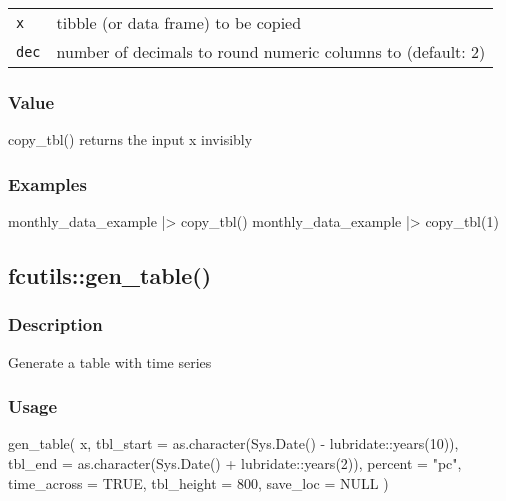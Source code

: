 \documentclass[
  letterpaper,
  DIV=11,
  numbers=noendperiod]{scrreport}
\newenvironment{Shaded}{\begin{snugshade}}{\end{snugshade}}
\newcommand{\AttributeTok}[1]{\textcolor[rgb]{0.40,0.45,0.13}{#1}}
\newcommand{\ConstantTok}[1]{\textcolor[rgb]{0.56,0.35,0.01}{#1}}
\newcommand{\DecValTok}[1]{\textcolor[rgb]{0.68,0.00,0.00}{#1}}
\newcommand{\FunctionTok}[1]{\textcolor[rgb]{0.28,0.35,0.67}{#1}}
\newcommand{\NormalTok}[1]{\textcolor[rgb]{0.00,0.23,0.31}{#1}}
\newcommand{\SpecialCharTok}[1]{\textcolor[rgb]{0.37,0.37,0.37}{#1}}
\newcommand{\StringTok}[1]{\textcolor[rgb]{0.13,0.47,0.30}{#1}}
\begin{document}
\begin{longtable}[]{@{}ll@{}}
\toprule\noalign{}
\endhead
\bottomrule\noalign{}
\endlastfoot
\texttt{x} & tibble (or data frame) to be copied \\
\texttt{dec} & number of decimals to round numeric columns to (default:
2) \\
\end{longtable}

\subsubsection{Value}\label{value-5}

copy\_tbl() returns the input x invisibly

\subsubsection{Examples}\label{examples-5}

\begin{Shaded}
\begin{Highlighting}[]
\NormalTok{monthly\_data\_example }\SpecialCharTok{|\textgreater{}} \FunctionTok{copy\_tbl}\NormalTok{()}
\NormalTok{monthly\_data\_example }\SpecialCharTok{|\textgreater{}} \FunctionTok{copy\_tbl}\NormalTok{(}\DecValTok{1}\NormalTok{)}
\end{Highlighting}
\end{Shaded}

\subsection{fcutils::gen\_table()}\label{fcutilsgen_table}

\subsubsection{Description}\label{description-6}

Generate a table with time series

\subsubsection{Usage}\label{usage-6}

\begin{Shaded}
\begin{Highlighting}[]
\FunctionTok{gen\_table}\NormalTok{(}
\NormalTok{  x,}
  \AttributeTok{tbl\_start =} \FunctionTok{as.character}\NormalTok{(}\FunctionTok{Sys.Date}\NormalTok{() }\SpecialCharTok{{-}}\NormalTok{ lubridate}\SpecialCharTok{::}\FunctionTok{years}\NormalTok{(}\DecValTok{10}\NormalTok{)),}
  \AttributeTok{tbl\_end =} \FunctionTok{as.character}\NormalTok{(}\FunctionTok{Sys.Date}\NormalTok{() }\SpecialCharTok{+}\NormalTok{ lubridate}\SpecialCharTok{::}\FunctionTok{years}\NormalTok{(}\DecValTok{2}\NormalTok{)),}
  \AttributeTok{percent =} \StringTok{"pc"}\NormalTok{,}
  \AttributeTok{time\_across =} \ConstantTok{TRUE}\NormalTok{,}
  \AttributeTok{tbl\_height =} \DecValTok{800}\NormalTok{,}
  \AttributeTok{save\_loc =} \ConstantTok{NULL}
\NormalTok{)}
\end{Highlighting}
\end{Shaded}
\end{document}
